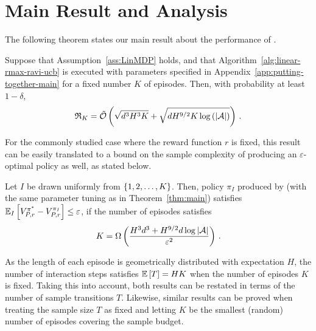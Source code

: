 \section{Main Result and Analysis}
\label{sec:analysis}

The following theorem states our main result about the performance of \algname.
%
\begin{theorem} \label{thm:main}
    Suppose that Assumption~\ref{ass:LinMDP} holds, and that Algorithm~\ref{alg:linear-rmax-ravi-ucb} is executed with parameters specified in Appendix~\ref{app:putting-together-main} for a fixed number $K$ of episodes. Then, with probability at least $1 - \delta$,
    \begin{equation*}
        \regretK = \tilde\cO \spr{\sqrt{d^3 H^3 K} + \sqrt{d H^{9/2} K \log \spr{\abs{\cA}}}}\,.
    \end{equation*}
\end{theorem}
%
For the commonly studied case where the reward function $r$ is fixed, this result can be easily translated to a bound on the sample complexity of producing an $\varepsilon$-optimal policy as well, as stated below.
%
\begin{corollary} \label{cor:sample}
    Let $I$ be drawn uniformly from $\ev{1,2,\dots,K}$. Then, policy $\pi_I$ produced by  (with the same parameter tuning as in Theorem~\ref{thm:main}) satisfies $\EEs{V^{\pi^*}_{P,r} - V^{\pi_I}_{P,r}}{I} \le \varepsilon$, if the number of episodes satisfies
    \begin{equation*}
        K = \Omega\pa{\frac{H^3 d^3 + H^{9/2} d \log \abs{\cA}}{\varepsilon^2}}\,.
    \end{equation*}
\end{corollary}
%
As the length of each episode is geometrically distributed with expectation $H$, the number of interaction steps satisfies $\EE{T} = HK$ when the number of episodes $K$ is fixed. Taking this into account, both results can be restated in terms of the number of sample transitions $T$. Likewise, similar results can be proved when treating the sample size $T$ as fixed and letting $K$ be the smallest (random) number of episodes covering the sample budget.

